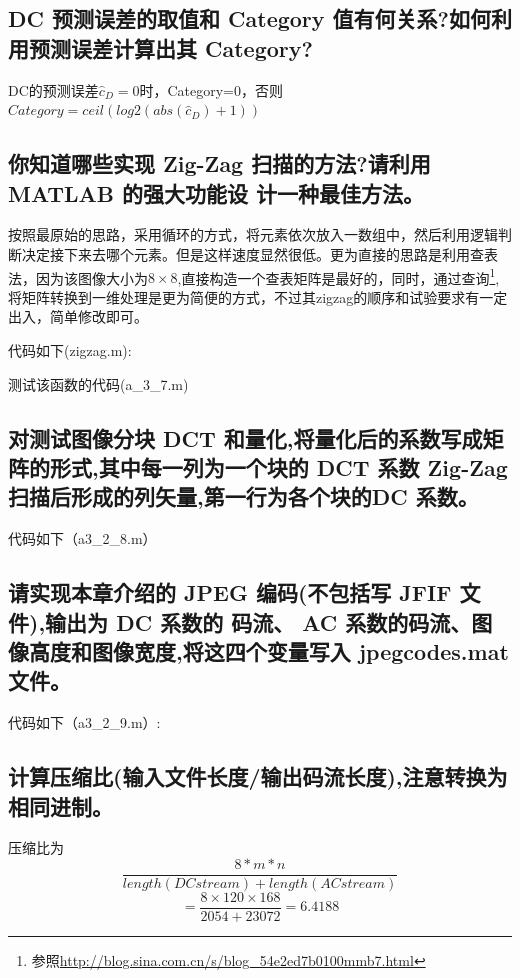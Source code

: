 \documentclass{ctexart}
\begin{document}
\subsection{
DC 预测误差的取值和 Category 值有何关系?如何利用预测误差计算出其 Category?
}

DC的预测误差$\hat{c}_D=0$时，Category=0，否则$Category=ceil(log2(abs(\hat{c}_D)+1))$

\subsection{
 你知道哪些实现 Zig-Zag 扫描的方法?请利用 MATLAB 的强大功能设
计一种最佳方法。
}
按照最原始的思路，采用循环的方式，将元素依次放入一数组中，然后利用逻辑判断决定接下来去哪个元素。但是这样速度显然很低。更为直接的思路是利用查表法，因为该图像大小为$8\times8$,直接构造一个查表矩阵是最好的，同时，通过查询\footnote{参照\url{http://blog.sina.com.cn/s/blog_54e2ed7b0100mmb7.html}},将矩阵转换到一维处理是更为简便的方式，不过其zigzag的顺序和试验要求有一定出入，简单修改即可。

代码如下(zigzag.m):

测试该函数的代码(a\_3\_7.m)


\subsection{
对测试图像分块 DCT 和量化,将量化后的系数写成矩阵的形式,其中每一列为一个块的 DCT 系数 Zig-Zag 扫描后形成的列矢量,第一行为各个块的DC 系数。
}
代码如下（a3\_2\_8.m）

\subsection{
请实现本章介绍的 JPEG 编码(不包括写 JFIF 文件),输出为 DC 系数的
码流、 AC 系数的码流、图像高度和图像宽度,将这四个变量写入 jpegcodes.mat
文件。
}
代码如下（a3\_2\_9.m）:

\subsection{
 计算压缩比(输入文件长度/输出码流长度),注意转换为相同进制。
}
压缩比为\[\frac{8*m*n}{length(DCstream)+length(ACstream)}\]
\[=\frac{8\times 120 \times 168}{2054+23072}=6.4188\]
\end{document}
